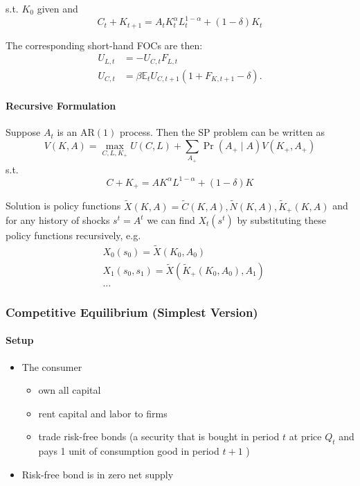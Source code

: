\documentclass[10pt]{article}
\begin{document}
s.t. $K_0$ given and
$$
C_t+K_{t+1}=A_t K_t^\alpha L_t^{1-\alpha}+(1-\delta) K_t
$$

The corresponding short-hand FOCs are then:
$$
\begin{aligned}
U_{L, t} & =-U_{C, t} F_{L, t} \\
U_{C, t} & =\beta \mathbb{E}_t U_{C, t+1}\left(1+F_{K, t+1}-\delta\right) .
\end{aligned}
$$


\paragraph{Recursive Formulation}

Suppose $A_t$ is an $\mathrm{AR}(1)$ process. Then the SP problem can be written as
$$
V(K, A)=\max _{C, L, K_{+}} U(C, L)+\sum_{A_{+}} \operatorname{Pr}\left(A_{+} \mid A\right) V\left(K_{+}, A_{+}\right)
$$
s.t.
$$
C+K_{+}=A K^\alpha L^{1-\alpha}+(1-\delta) K
$$

Solution is policy functions $\widetilde{X}(K, A)=\widetilde{C}(K, A), \widetilde{N}(K, A), \widetilde{K}_{+}(K, A)$ and for any history of shocks $s^t=A^t$ we can find $X_t\left(s^t\right)$ by substituting these policy functions recursively, e.g.
$$
\begin{aligned}
& X_0\left(s_0\right)=\widetilde{X}\left(K_0, A_0\right) \\
& X_1\left(s_0, s_1\right)=\widetilde{X}\left(\widetilde{K}_{+}\left(K_0, A_0\right), A_1\right) \\
& \ldots
\end{aligned}
$$


\subsubsection{Competitive Equilibrium (Simplest Version)}

\paragraph{Setup}

\begin{itemize}
    \item The consumer
        \begin{itemize}
            \item own all capital
            \item rent capital and labor to firms
            \item trade risk-free bonds (a security that is bought in period $t$ at price $Q_t$ and pays 1 unit of consumption good in period $t+1$ )
        \end{itemize}
    \item Risk-free bond is in zero net supply
\end{itemize}
\end{document}
